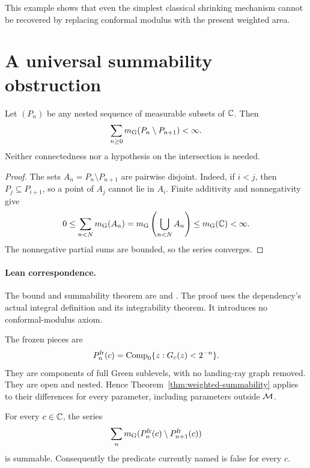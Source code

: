 This example shows that even the simplest classical shrinking mechanism
cannot be recovered by replacing conformal modulus with the present
weighted area.

\section{A universal summability obstruction}

\begin{theorem}
\label{thm:weighted-summability}
Let $(P_n)$ be any nested sequence of measurable subsets of $\mathbb C$.
Then
\[
 \sum_{n\ge0}m_{\mathrm G}(P_n\setminus P_{n+1})<\infty.
\]
Neither connectedness nor a hypothesis on the intersection is needed.
\end{theorem}

\begin{proof}
The sets $A_n=P_n\setminus P_{n+1}$ are pairwise disjoint.
Indeed, if $i<j$, then $P_j\subseteq P_{i+1}$, so a point of $A_j$
cannot lie in $A_i$.  Finite additivity and nonnegativity give
\[
 0\le\sum_{n<N}m_{\mathrm G}(A_n)
   =m_{\mathrm G}\left(\bigcup_{n<N}A_n\right)
   \le m_{\mathrm G}(\mathbb C)<\infty.
\]
The nonnegative partial sums are bounded, so the series converges.
\end{proof}

\paragraph{Lean correspondence.}
The bound and summability theorem are
 and
.
The proof uses the dependency's actual integral definition and its
integrability theorem.  It introduces no conformal-modulus axiom.

The frozen pieces are
\[
 P_n^{\rm fr}(c)=
 \operatorname{Comp}_0\{z:G_c(z)<2^{-n}\}.
\]
They are components of full Green sublevels, with no landing-ray graph
removed.  They are open and nested.  Hence
Theorem~\ref{thm:weighted-summability} applies to their differences for
every parameter, including parameters outside $\mathcal M$.

\begin{corollary}
\label{cor:empty-frozen-class}
For every $c\in\mathbb C$, the series
\[
 \sum_nm_{\mathrm G}
       (P_n^{\rm fr}(c)\setminus P_{n+1}^{\rm fr}(c))
\]
is summable.  Consequently the predicate currently named
 is false for every $c$.
\end{corollary}

